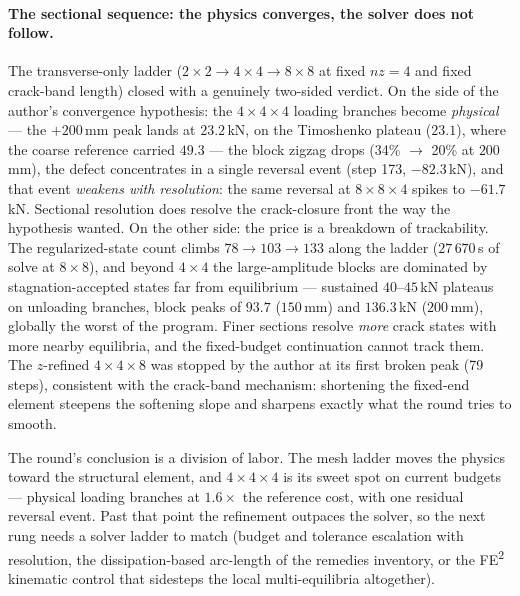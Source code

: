 \paragraph{The sectional sequence: the physics converges, the solver
does not follow.} The transverse-only ladder ($2{\times}2 \to 4{\times}4
\to 8{\times}8$ at fixed $nz=4$ and fixed crack-band length) closed with
a genuinely two-sided verdict. On the side of the author's convergence
hypothesis: the $4{\times}4{\times}4$ loading branches become
\emph{physical} --- the $+200$\,mm peak lands at $23.2$\,kN, on the
Timoshenko plateau ($23.1$), where the coarse reference carried
$49.3$ --- the block zigzag drops (34\% $\to$ 20\% at $200$\,mm), the
defect concentrates in a single reversal event (step 173,
$-82.3$\,kN), and that event \emph{weakens with resolution}: the same
reversal at $8{\times}8{\times}4$ spikes to $-61.7$\,kN. Sectional
resolution does resolve the crack-closure front the way the hypothesis
wanted. On the other side: the price is a breakdown of trackability.
The regularized-state count climbs $78 \to 103 \to 133$ along the
ladder ($27\,670$\,s of solve at $8{\times}8$), and beyond
$4{\times}4$ the large-amplitude blocks are dominated by
stagnation-accepted states far from equilibrium --- sustained
$40$--$45$\,kN plateaus on unloading branches, block peaks of $93.7$
($150$\,mm) and $136.3$\,kN ($200$\,mm), globally the worst of the
program. Finer sections resolve \emph{more} crack states with more
nearby equilibria, and the fixed-budget continuation cannot track
them. The $z$-refined $4{\times}4{\times}8$ was stopped by the author
at its first broken peak (79 steps), consistent with the crack-band
mechanism: shortening the fixed-end element steepens the softening
slope and sharpens exactly what the round tries to smooth.

The round's conclusion is a division of labor. The mesh ladder moves
the physics toward the structural element, and $4{\times}4{\times}4$
is its sweet spot on current budgets --- physical loading branches at
$1.6\times$ the reference cost, with one residual reversal event. Past
that point the refinement outpaces the solver, so the next rung needs
a solver ladder to match (budget and tolerance escalation with
resolution, the dissipation-based arc-length of the remedies
inventory, or the FE\textsuperscript{2} kinematic control that
sidesteps the local multi-equilibria altogether).
